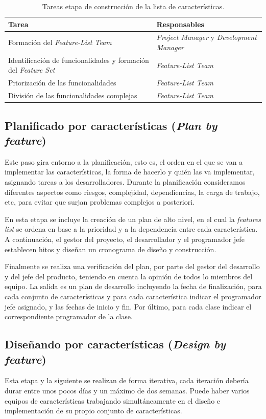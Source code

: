 \documentclass[11pt]{article}
\begin{document}
\begin{table}[H]
  \centering
\begin{tabular}{ |p{6cm}|p{6cm}|  }
	\hline
	Tarea & Responsables \\
	\hline
	Formación del
	\textit{Feature-List Team}  &    \textit{Project
		Manager} y 
	\textit{	Development
		Manager}\\
	Identificación de funcionalidades y formación del \textit{Feature Set}  & \textit{Feature-List Team}\\
	Priorización de las funcionalidades &  \textit{Feature-List Team}\\
	División de las funcionalidades complejas    & \textit{Feature-List Team}\\
	\hline
\end{tabular}
\caption{Tareas etapa de construcción de la lista de características.}\label{fig:BFL}
\end{table}

\subsection{Planificado por características (\textit{Plan by feature})}
Este paso gira entorno a la planificación, esto es, el orden en el que se van a implementar las características, la forma de hacerlo y quién las va implementar, asignando tareas a los desarrolladores.
Durante la planificación consideramos diferentes aspectos como riesgos, complejidad, dependiencias, la carga de trabajo, etc, para evitar que surjan problemas complejos a posteriori.

En esta etapa se incluye la creación de un plan de alto nivel, en el cual la \textit{features list} se ordena en base a la prioridad y a la dependencia entre cada característica. A continuación, el gestor del proyecto, el desarrollador y el programador jefe establecen hitos y diseñan un cronograma de diseño y construcción.

Finalmente se realiza una verificación del plan, por parte del gestor del desarrollo y del jefe del producto, teniendo en cuenta la opinión de todos lo miembros del equipo. La salida es un plan de desarrollo incluyendo la fecha de finalización, para cada conjunto de características y para cada característica indicar el programador jefe asignado, y las fechas de inicio y fin. Por último, para cada clase indicar el correspondiente programador de la clase.


\subsection{Diseñando por características (\textit{Design by feature})}
Esta etapa y la siguiente se realizan de forma iterativa, cada iteración debería durar entre unos pocos días y un máximo de dos semanas. Puede haber varios equipos de características trabajando simultáneamente en el diseño e implementación de su propio conjunto de características. 
\end{document}

